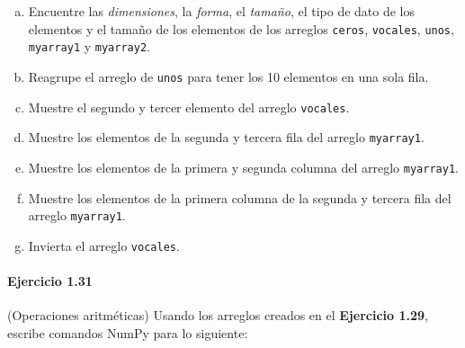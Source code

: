 \begin{enumerate}[(a)]
	\item

	      Encuentre las \emph{dimensiones}, la \emph{forma}, el
	      \emph{tamaño}, el tipo de dato de los elementos y el tamaño
	      de los elementos de los arreglos \texttt{ceros},
	      \texttt{vocales}, \texttt{unos},
	      \texttt{myarray1} y
	      \texttt{myarray2}.

	\item

	      Reagrupe el arreglo de \texttt{unos} para tener
	      los 10 elementos en una sola fila.

	\item

	      Muestre el segundo y tercer elemento del arreglo
	      \texttt{vocales}.

	\item

	      Muestre los elementos de la segunda y tercera fila del
	      arreglo \texttt{myarray1}.

	\item

	      Muestre los elementos de la primera y segunda columna del
	      arreglo \texttt{myarray1}.

	\item

	      Muestre los elementos de la primera columna de la segunda y
	      tercera fila del arreglo \texttt{myarray1}.

	\item

	      Invierta el arreglo \texttt{vocales}.
\end{enumerate}

\paragraph{\color{DarkBlue}Ejercicio 1.31}
(Operaciones aritméticas)
Usando los arreglos creados en el \textbf{Ejercicio 1.29},
escribe comandos NumPy para lo siguiente:

